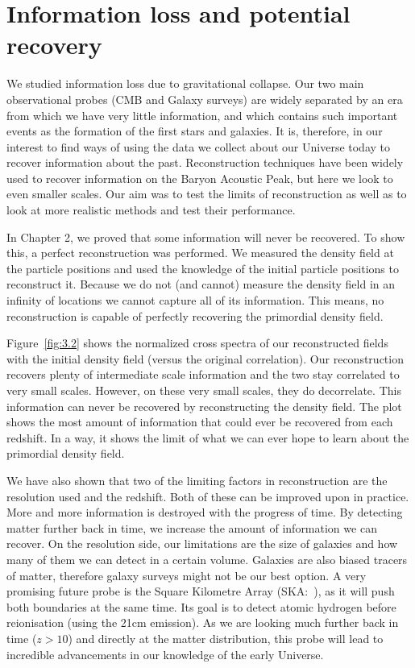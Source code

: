 
\section{Information loss and potential recovery}

We studied information loss due to gravitational collapse. Our two main observational probes (CMB and Galaxy surveys) are widely separated by an era from which we have very little information, and which contains such important events as the formation of the first stars and galaxies. It is, therefore, in our interest to find ways of using the data we collect about our Universe today to recover information about the past. Reconstruction techniques have been widely used to recover information on the Baryon Acoustic Peak, but here we look to even smaller scales. Our aim was to test the limits of reconstruction as well as to look at more realistic methods and test their performance.

In Chapter 2, we proved that some information will never be recovered. To show this, a perfect reconstruction was performed. We measured the density field at the particle positions and used the knowledge of the initial particle positions to reconstruct it. Because we do not (and cannot) measure the density field in an infinity of locations we cannot capture all of its information. This means, no reconstruction is capable of perfectly recovering the primordial density field.

Figure~\ref{fig:3.2} shows the normalized cross spectra of our reconstructed fields with the initial density field (versus the original correlation). Our reconstruction recovers plenty of  intermediate scale information and the two stay correlated to very small scales. However, on these very small scales, they do decorrelate. This information can never be recovered by reconstructing the density field. The plot shows the most amount of information that could ever be recovered from each redshift. In a way, it shows the limit of what we can ever hope to learn about the primordial density field. 

We have also shown that two of the limiting factors in reconstruction are the resolution used and the redshift. Both of these can be improved upon in practice. More and more information is destroyed with the progress of time. By detecting matter further back in time, we increase the amount of information we can recover. On the resolution side, our limitations are the size of galaxies and how many of them we can detect in a certain volume. Galaxies are also biased tracers of matter, therefore galaxy surveys might not be our best option. A very promising future probe is the Square Kilometre Array (SKA:~\cite{dewdney2009square}), as it will push both boundaries at the same time. Its goal is to detect atomic hydrogen before reionisation (using the 21cm emission). As we are looking much further back in time ($z>10$) and directly at the matter distribution, this probe will lead to incredible advancements in our knowledge of the early Universe.


